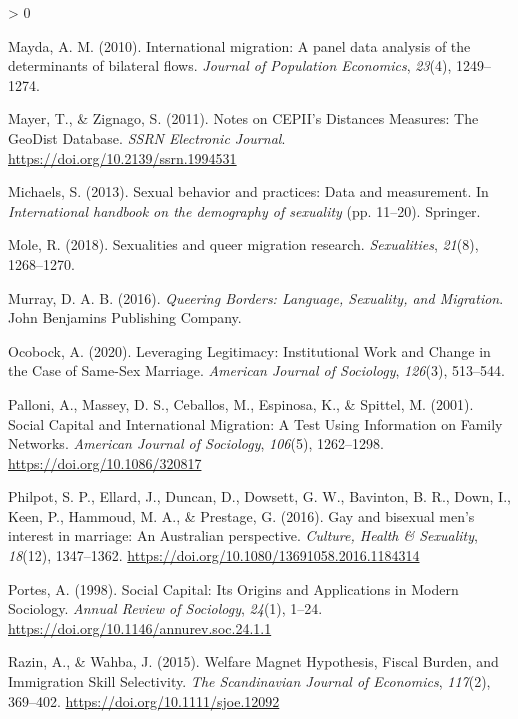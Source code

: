 \documentclass[
  11pt,
]{article}
\newlength{\cslhangindent}
\newenvironment{CSLReferences}[2] %
 {%
  \setlength{\parindent}{0pt}
  \ifodd #1 \everypar{\setlength{\hangindent}{\cslhangindent}}\ignorespaces\fi
  \ifnum #2 > 0
  \setlength{\parskip}{#2\baselineskip}
  \fi
 }%
 {}
\begin{document}
\begin{CSLReferences}{1}{0}
\leavevmode\hypertarget{ref-mayda_2010}{}%
Mayda, A. M. (2010). International migration: A panel data analysis of the determinants of bilateral flows. \emph{Journal of Population Economics}, \emph{23}(4), 1249--1274.

\leavevmode\hypertarget{ref-mayer_2011}{}%
Mayer, T., \& Zignago, S. (2011). Notes on {CEPII}'s {Distances Measures}: {The GeoDist Database}. \emph{SSRN Electronic Journal}. \url{https://doi.org/10.2139/ssrn.1994531}

\leavevmode\hypertarget{ref-michaels_2013}{}%
Michaels, S. (2013). Sexual behavior and practices: {Data} and measurement. In \emph{International handbook on the demography of sexuality} (pp. 11--20). {Springer}.

\leavevmode\hypertarget{ref-mole_2018a}{}%
Mole, R. (2018). Sexualities and queer migration research. \emph{Sexualities}, \emph{21}(8), 1268--1270.

\leavevmode\hypertarget{ref-murray_2016}{}%
Murray, D. A. B. (2016). \emph{Queering {Borders}: {Language}, {Sexuality}, and {Migration}}. {John Benjamins Publishing Company}.

\leavevmode\hypertarget{ref-ocobock_2020_leveraging}{}%
Ocobock, A. (2020). Leveraging {Legitimacy}: {Institutional Work} and {Change} in the {Case} of {Same}-{Sex Marriage}. \emph{American Journal of Sociology}, \emph{126}(3), 513--544.

\leavevmode\hypertarget{ref-palloni_2001}{}%
Palloni, A., Massey, D. S., Ceballos, M., Espinosa, K., \& Spittel, M. (2001). Social {Capital} and {International Migration}: {A Test Using Information} on {Family Networks}. \emph{American Journal of Sociology}, \emph{106}(5), 1262--1298. \url{https://doi.org/10.1086/320817}

\leavevmode\hypertarget{ref-philpot_2016_gay}{}%
Philpot, S. P., Ellard, J., Duncan, D., Dowsett, G. W., Bavinton, B. R., Down, I., Keen, P., Hammoud, M. A., \& Prestage, G. (2016). Gay and bisexual men's interest in marriage: An {Australian} perspective. \emph{Culture, Health \& Sexuality}, \emph{18}(12), 1347--1362. \url{https://doi.org/10.1080/13691058.2016.1184314}

\leavevmode\hypertarget{ref-portes_1998}{}%
Portes, A. (1998). Social {Capital}: {Its Origins} and {Applications} in {Modern Sociology}. \emph{Annual Review of Sociology}, \emph{24}(1), 1--24. \url{https://doi.org/10.1146/annurev.soc.24.1.1}

\leavevmode\hypertarget{ref-razin_2015}{}%
Razin, A., \& Wahba, J. (2015). Welfare {Magnet Hypothesis}, {Fiscal Burden}, and {Immigration Skill Selectivity}. \emph{The Scandinavian Journal of Economics}, \emph{117}(2), 369--402. \url{https://doi.org/10.1111/sjoe.12092}


\end{CSLReferences}
\end{document}
